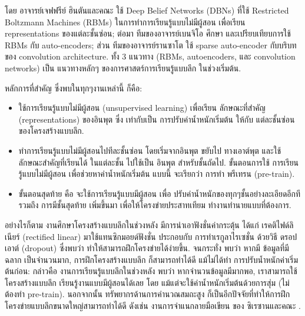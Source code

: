 โดย อาจารย์เจฟฟรีย์ ฮินตันและคณะ \cite{HintonEtAl2006a} ใช้ Deep Belief Networks (DBNs) ที่ใช้ Restricted Boltzmann Machines (RBMs) ในการทำการเรียนรู้แบบไม่มีผู้สอน เพื่อเรียน representations ของแต่ละชั้นซ่อน;
ต่อมา ทีมของอาจารย์เบนจิโอ \cite{BengioEtAl2007a} ศึกษา และเปรียบเทียบการใช้ RBMs กับ auto-encoders;
ส่วน ทีมของอาจารย์รานซาโต \cite{RanzatoEtAl2007a} ใช้ sparse auto-encoder กับบริบทของ convolution architecture.
ทั้ง 3 แนวทาง (RBMs, autoencoders, และ convolution networks) เป็น แนวทางหลักๆ ของการศาสตร์การเรียนรู้แบบลึก ในช่วงเริ่มต้น.

หลักการที่สำคัญ ซึ่งพบในทุกๆงานเหล่านี้ ก็คือ:
\begin{itemize}
\item ใช้การเรียนรู้แบบไม่มีผู้สอน (unsupervised learning) เพื่อเรียน ลักษณะที่สำคัญ (representations) ของอินพุต ซึ่ง เท่ากับเป็น การปรับค่าน้ำหนักเริ่มต้น ให้กับ แต่ละชั้นซ่อน ของโครงสร้างแบบลึก.
\item ทำการเรียนรู้แบบไม่มีผู้สอนไปทีละชั้นซ่อน โดยเริ่มจากอินพุต ขยับไป ทางเอาต์พุต และใช้ ลักษณะสำคัญที่เรียนได้ ในแต่ละชั้น ไปใช้เป็น อินพุต สำหรับชั้นถัดไป.
ขั้นตอนการใช้ การเรียนรู้แบบไม่มีผู้สอน เพื่อช่วยหาค่าน้ำหนักเริ่มต้น แบบนี้ จะเรียกว่า การทำ พรีเทรน (pre-train).
\item ขั้นตอนสุดท้าย คือ จะใช้การเรียนรู้แบบมีผู้สอน เพื่อ ปรับค่าน้ำหนักของทุกๆชั้นอย่างละเอียดอีกที รวมถึง การมีชั้นสุดท้าย เพิ่มขึ้นมา เพื่อให้โครงข่ายประสาทเทียม ทำงานทำนายแบบที่ต้องการ.
\end{itemize}


อย่างไรก็ตาม งานศึกษาโครงสร้างแบบลึกในช่วงหลัง มีการนำเอาฟังชั่นค่ากระตุ้น ได้แก่ เรคติไฟด์ลิเนียร์ (rectified linear)   มาใช้แทนซิกมอยด์ฟังชั่น ประกอบกับ การทำเรกูลาไรเซชั่น ด้วยวิธี ดรอปเอาต์ (dropout)   ซึ่งพบว่า ทำให้สามารถฝึกโครงข่ายได้ง่ายขึ้น.
จนกระทั่ง พบว่า หากมี ข้อมูลที่มีฉลาก เป็นจำนวนมาก, การฝึกโครงสร้างแบบลึก ก็สามารถทำได้ดี แม้ไม่ได้ทำ การปรับน้ำหนักค่าเริ่มต้นก่อน:
กล่าวคือ งานการเรียนรู้แบบลึกในช่วงหลัง พบว่า หากจำนวนข้อมูลมีมากพอ, เราสามารถใช้ โครงสร้างแบบลึก เรียนรู้งานแบบมีผู้สอนได้เลย โดย แม้แต่จะใช้ค่าน้ำหนักเริ่มต้นด้วยการสุ่ม (ไม่ต้องทำ pre-train).
นอกจากนั้น ทรัพยากรด้านการคำนวณสมถะสูง ก็เป็นอีกปัจจัยที่ทำให้การฝึกโครงข่ายแบบลึกขนาดใหญ่สามารถทำได้ดี ดังเช่น งานการจำแนกลายมือเขียน ของ ซิเรซานและคณะ \cite{CiresanEtAl2012a, MNIST20150311}.

